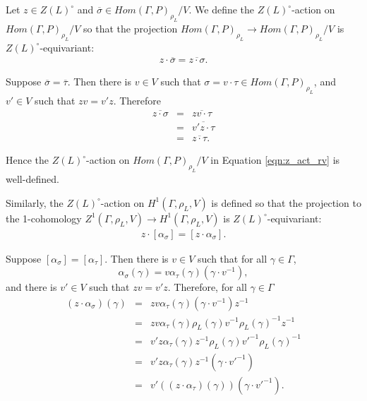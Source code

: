 Let $z \in Z(L)^\circ$ and $\overline{\sigma} \in Hom(\Gamma, P)_{\rho_L}/V$. We define the $Z(L)^\circ$-action on $Hom(\Gamma, P)_{\rho_L}/V$ so that the projection $Hom(\Gamma, P)_{\rho_L} \rightarrow Hom(\Gamma, P)_{\rho_L}/V$ is $Z(L)^\circ$-equivariant:
\begin{eqnarray}
  z \cdot \overline{\sigma} = \overline{z \cdot \sigma}.
  \label{eqn:z_act_rv}
\end{eqnarray}

Suppose $\overline{\sigma} = \overline{\tau}$. Then there is $v \in V$ such that $\sigma = v \cdot \tau \in Hom(\Gamma, P)_{\rho_L}$, and $v' \in V$ such that $zv = v' z$. Therefore
\begin{eqnarray*}
  \overline{z \cdot \sigma} &=& \overline{zv \cdot \tau} \\
  &=& \overline{v' z \cdot \tau} \\
  &=& \overline{z \cdot \tau}.
\end{eqnarray*}

Hence the $Z(L)^\circ$-action on $Hom(\Gamma, P)_{\rho_L}/V$ in Equation \ref{eqn:z_act_rv} is well-defined.

Similarly, the $Z(L)^\circ$-action on $H^1(\Gamma, \rho_L, V)$ is defined so that the projection to the 1-cohomology $Z^1(\Gamma, \rho_L, V) \rightarrow H^1(\Gamma, \rho_L, V)$ is $Z(L)^\circ$-equivariant:
\begin{eqnarray}
  z \cdot [\alpha_\sigma] = [z \cdot \alpha_\sigma].
  \label{eqn:z_act_h}
\end{eqnarray}

Suppose $[\alpha_\sigma] = [\alpha_\tau]$. Then there is $v \in V$ such that for all $\gamma \in \Gamma$,
\begin{displaymath}
  \alpha_\sigma(\gamma) = v \alpha_\tau(\gamma) (\gamma \cdot v^{-1}),
\end{displaymath}
and there is $v' \in V$ such that $zv = v' z$. Therefore, for all $\gamma \in \Gamma$
\begin{eqnarray*}
	(z \cdot \alpha_\sigma)(\gamma) 
  &=& z v \alpha_\tau(\gamma) (\gamma \cdot v^{-1}) z^{-1} \\
  &=& z v \alpha_\tau(\gamma) \rho_L(\gamma) v^{-1} \rho_L(\gamma)^{-1} z^{-1} \\
  &=& v' z \alpha_\tau(\gamma) z^{-1} \rho_L(\gamma) v'^{-1} \rho_L(\gamma)^{-1} \\
  &=& v' z \alpha_\tau(\gamma) z^{-1} (\gamma \cdot v'^{-1}) \\
  &=& v' ((z \cdot \alpha_\tau)(\gamma)) (\gamma \cdot v'^{-1}).
\end{eqnarray*}

